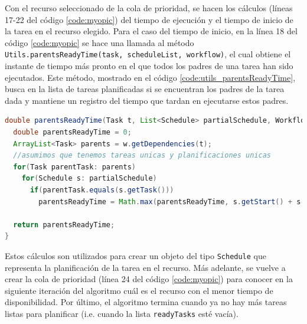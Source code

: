 Con el recurso seleccionado de la cola de prioridad, se hacen los cálculos (líneas 17-22 del código \ref{code:myopic}) del tiempo de ejecución y el tiempo de inicio de la tarea en el recurso elegido. Para el caso del tiempo de inicio, en la línea 18 del código \ref{code:myopic} se hace una llamada al método \texttt{Utils.parentsReadyTime(task, scheduleList, workflow)}, el cual obtiene el instante de tiempo más pronto en el que todos los padres de una tarea han sido ejecutados. Este método, mostrado en el código \ref{code:utils_parentsReadyTime}, busca en la lista de tareas planificadas si se encuentran los padres de la tarea dada y mantiene un registro del tiempo que tardan en ejecutarse estos padres.

\begin{lstlisting}[language=java,label={code:utils_parentsReadyTime},caption={Método que calcula el tiempo mínimo en el que los padres de una tarea dada han sido ejecutados.},float]
double parentsReadyTime(Task t, List<Schedule> partialSchedule, Workflow w) {
  double parentsReadyTime = 0;
  ArrayList<Task> parents = w.getDependencies(t);
  //asumimos que tenemos tareas unicas y planificaciones unicas
  for(Task parentTask: parents)
    for(Schedule s: partialSchedule)
      if(parentTask.equals(s.getTask()))
        parentsReadyTime = Math.max(parentsReadyTime, s.getStart() + s.getDuration());

  return parentsReadyTime;
}
\end{lstlisting}

Estos cálculos son utilizados para crear un objeto del tipo \texttt{Schedule} que representa la planificación de la tarea en el recurso. Más adelante, se vuelve a crear la cola de prioridad (línea 24 del código \ref{code:myopic}) para conocer en la siguiente iteración del algoritmo cuál es el recurso con el menor tiempo de disponibilidad. Por último, el algoritmo termina cuando ya no hay más tareas listas para planificar (i.e. cuando la lista \texttt{readyTasks} esté vacía).

